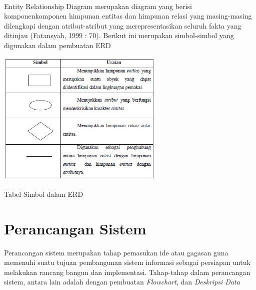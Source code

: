 \documentclass{jtetiproposalskripsi}
\begin{document}
\paragraph{}
Entity Relationship Diagram merupakan diagram yang berisi komponenkomponen himpunan entitas dan himpunan relasi yang masing-masing dilengkapi dengan atribut-atribut yang merepresentasikan seluruh fakta yang ditinjau (Fatansyah, 1999 : 70). Berikut ini merupakan simbol-simbol yang digunakan dalam pembuatan ERD

\begin{table}[ht!]
  \centering
    \includegraphics[width=0.6\textwidth]{gambar/2}
    \caption{Tabel Simbol dalam ERD}
    \label{wsn}
\end{table}
\newpage

\section{Perancangan Sistem}
Perancangan sistem merupakan tahap pemasukan ide atau gagasan guna memenuhi suatu tujuan pembangunan sistem informasi sebagai persiapan untuk melakukan rancang bangun dan implementasi. Tahap-tahap dalam perancangan sistem, antara lain adalah dengan pembuatan \textit{Flowchart}, dan \textit{Deskripsi Data} 
\end{document}
